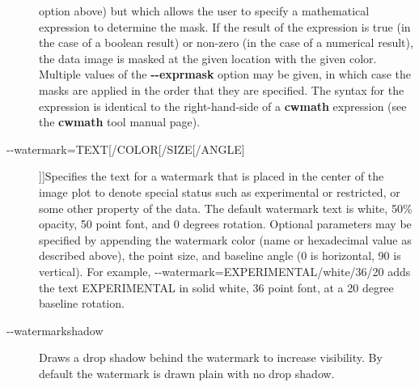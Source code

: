 \begin{description}
 option above) but which allows the user to specify a mathematical expression to determine the mask. If the result of the expression is true (in the case of a boolean result) or non-zero (in the case of a numerical result), the data image is masked at the given location with the given color. Multiple values of the \textbf{-{-}exprmask}
 option may be given, in which case the masks are applied in the order that they are specified. The syntax for the expression is identical to the right-hand-side of a \textbf{cwmath}
 expression (see the \textbf{cwmath}
 tool manual page).
\item[-{-}watermark=TEXT[/COLOR[/SIZE[/ANGLE{]}]{]}]Specifies the text for a watermark that is placed in the center of the image plot to denote special status such as experimental or restricted, or some other property of the data. The default watermark text is white, 50\% opacity, 50 point font, and 0 degrees rotation. Optional parameters may be specified by appending the watermark color (name or hexadecimal value as described above), the point size, and baseline angle (0 is horizontal, 90 is vertical). For example, -{-}watermark=EXPERIMENTAL/white/36/20 adds the text EXPERIMENTAL in solid white, 36 point font, at a 20 degree baseline rotation.
\item[-{-}watermarkshadow]Draws a drop shadow behind the watermark to increase visibility. By default the watermark is drawn plain with no drop shadow.

\end{description}
